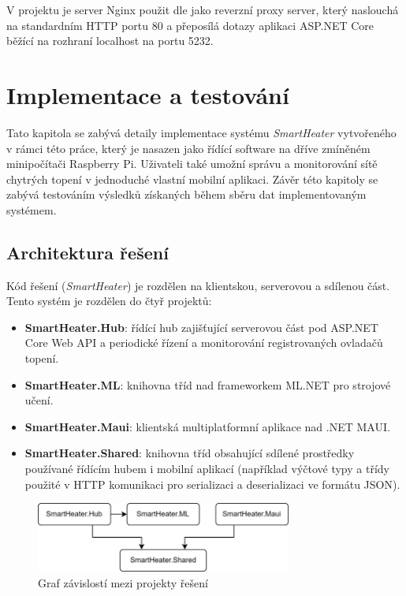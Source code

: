V projektu je server Nginx použit dle \cite{nginx_asp} jako reverzní proxy server, který naslouchá na standardním HTTP portu 80 a přeposílá dotazy aplikaci ASP.NET Core běžící na rozhraní localhost na portu 5232.

\chapter{Implementace a testování}
\label{implementace}

Tato kapitola se zabývá detaily implementace systému {\it SmartHeater} vytvořeného v rámci této práce, který je nasazen jako řídící software na dříve zmíněném minipočítači Raspberry Pi. Uživateli také umožní správu a monitorování sítě chytrých topení v jednoduché vlastní mobilní aplikaci. Závěr této kapitoly se zabývá testováním výsledků získaných během sběru dat implementovaným systémem.

\section{Architektura řešení}
Kód řešení ({\it SmartHeater}) je rozdělen na klientskou, serverovou a sdílenou část. Tento systém je rozdělen do čtyř projektů:
\begin{itemize}
    \item \textbf{SmartHeater.Hub}: řídící hub zajišťující serverovou část pod ASP.NET Core Web API a periodické řízení a monitorování registrovaných ovladačů topení.
    \item \textbf{SmartHeater.ML}: knihovna tříd nad frameworkem ML.NET pro strojové učení.
    \item \textbf{SmartHeater.Maui}: klientská multiplatformní aplikace nad .NET MAUI.
    \item \textbf{SmartHeater.Shared}: knihovna tříd obsahující sdílené prostředky používané řídícím hubem i mobilní aplikací (například výčtové typy a třídy použité v HTTP komunikaci pro serializaci a deserializaci ve formátu JSON).
\end{itemize}

\begin{figure}[hbt]
\centering
\includegraphics[width=0.75\textwidth]{obrazky-figures/smartheater-architecture.png}
\caption{Graf závislostí mezi projekty řešení}
\end{figure}

